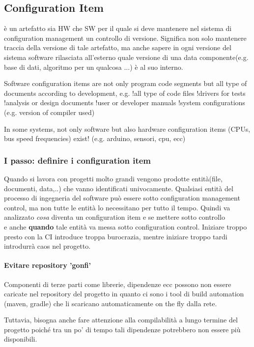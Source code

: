 \documentclass[10pt,a4paper]{book}
\begin{document}
\subsection{Configuration Item} è un artefatto sia HW che SW per il quale si deve mantenere nel sistema di configuration management un controllo di versione. Significa non solo mantenere traccia della versione di tale artefatto, ma anche sapere in ogni versione del sistema software rilasciata all'esterno quale versione di una data componente(e.g. base di dati, algoritmo per un qualcosa ...) è al suo interno.

Software configuration items are not only program code segments but all type of documents according to development, e.g.
!all type of code files
!drivers for tests
!analysis or design documents
!user or developer manuals
!system configurations (e.g. version of compiler used)

In some systems, not only software but also hardware configuration items (CPUs, bus speed frequencies) exist! (e.g. arduino, sensori, cpu, ecc)

\subsubsection{I passo: definire i configuration item}

Quando si lavora con progetti molto grandi vengono prodotte entità(file, documenti, data,..) che vanno identificati univocamente.
Qualsiasi entità del processo di ingegneria del software può essere sotto configuration management control, ma non tutte le entità lo necessitano per tutto il tempo.
Quindi va analizzato \textit{cosa} diventa un configuration item e se mettere sotto controllo\\
e anche \textbf{quando} tale entità va messa sotto configuration control.
Iniziare troppo presto con la CI introduce troppa burocrazia, mentre iniziare troppo tardi introdurrà caos nel progetto.

\paragraph{Evitare repository 'gonfi'}
Componenti di terze parti come librerie, dipendenze ecc possono non essere caricate nel repository del progetto in quanto ci sono i tool di build automation (maven, gradle) che li scaricano automaticamente on the fly dalla rete.

Tuttavia, bisogna anche fare attenzione alla compilabilità a lungo termine del progetto poiché tra un po' di tempo tali dipendenze potrebbero non essere più disponibili.
\end{document}
